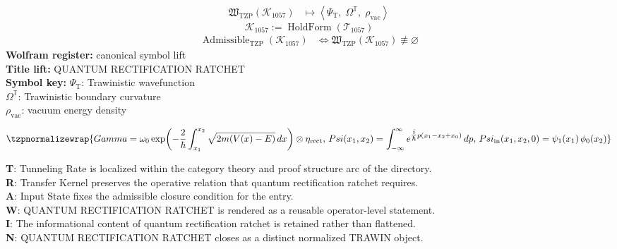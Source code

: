 \noindent
\begin{minipage}[t]{0.48\linewidth}
\begingroup
\small
\[
\begin{aligned}
\mathfrak{W}_{\mathrm{TZP}}\!\left(\mathcal{K}_{1057}\right)
&\longmapsto
\left\langle \Psi_{\mathrm{T}},\; \Omega^{\mathbb{T}},\; \rho_{\mathrm{vac}} \right\rangle
\end{aligned}
\]
\[
\mathcal{K}_{1057}
:=
\operatorname{HoldForm}\!\left(\mathcal{T}_{1057}\right)
\]
\[
\begin{aligned}
\operatorname{Admissible}_{\mathrm{TZP}}\!\left(\mathcal{K}_{1057}\right)
&\Longleftrightarrow
\mathfrak{W}_{\mathrm{TZP}}\!\left(\mathcal{K}_{1057}\right)\not\equiv\varnothing
\end{aligned}
\]
\textbf{Wolfram register:} canonical symbol lift\\
\textbf{Title lift:} QUANTUM RECTIFICATION RATCHET\\
\textbf{Symbol key:} \(\Psi_{\mathrm{T}}\): Trawinistic wavefunction\\ \(\Omega^{\mathbb{T}}\): Trawinistic boundary curvature\\ \(\rho_{\mathrm{vac}}\): vacuum energy density
\par
\endgroup
\end{minipage}\hfill
\begin{minipage}[t]{0.48\linewidth}
\[
\tzpnormalizewrap{Gamma=\omega_{0}\exp\!\left(-\frac{2}{\hbar}\int_{x_{1}}^{x_{2}}\sqrt{2m(V(x)-E)}\,dx\right)\otimes \eta_{\mathrm{rect}},\,Psi(x_{1},x_{2})=\int_{-\infty}^{\infty}e^{\tfrac{i}{\hbar}p(x_{1}-x_{2}+x_{0})}\,dp,\,Psi_{\mathrm{in}}(x_{1},x_{2},0)=\psi_{1}(x_{1})\,\phi_{0}(x_{2})}
\]

\small
\textbf{T}: Tunneling Rate is localized within the category theory and proof structure arc of the directory.\\
\textbf{R}: Transfer Kernel preserves the operative relation that quantum rectification ratchet requires.\\
\textbf{A}: Input State fixes the admissible closure condition for the entry.\\
\textbf{W}: QUANTUM RECTIFICATION RATCHET is rendered as a reusable operator-level statement.\\
\textbf{I}: The informational content of quantum rectification ratchet is retained rather than flattened.\\
\textbf{N}: QUANTUM RECTIFICATION RATCHET closes as a distinct normalized TRAWIN object.
\normalsize
\end{minipage}

